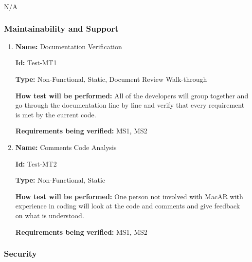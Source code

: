\documentclass[12pt, titlepage]{article}
\begin{document}
N/A

\subsubsection{Maintainability and Support}

\begin{enumerate}

\item{\textbf{Name:} Documentation Verification} \label{itm:Test-MT1}

\textbf{Id:} Test-MT1

\textbf{Type:} Non-Functional, Static, Document Review Walk-through
			
\textbf{How test will be performed:} All of the developers will group together and go through the documentation line by line and verify that every requirement is met by the current code.

\textbf{Requirements being verified:} MS1, MS2

\item{\textbf{Name:} Comments Code Analysis} \label{itm:Test-MT2}

\textbf{Id:} Test-MT2

\textbf{Type:} Non-Functional, Static
					
\textbf{How test will be performed:} One person not involved with MacAR with experience in coding will look at the code and comments and give feedback on what is understood.

\textbf{Requirements being verified:} MS1, MS2

\end{enumerate}

\subsubsection{Security}
\end{document}
